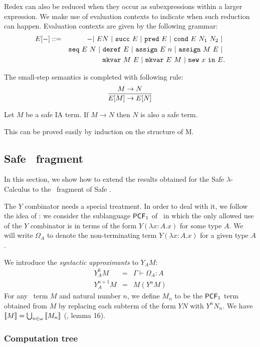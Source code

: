 Redex can also be reduced when they occur as subexpressions within a
larger expression. We make use of evaluation contexts to indicate
when such reduction can happen. Evaluation contexts are given by the
following grammar:
\begin{eqnarray*}
E[-] &::=& - |\ E N\ |\ \pcfsucc\ E\ |\ \pcfpred\ E\ |\ \pcfcond\ E\ N_1\ N_2\ |\ \\
&&    \iaseq\ E\ N\ |\ \iaderef\ E\ |\ \iaassign\ E\ n\ |\ \iaassign\ M\ E \ |\ \\
&&    \iamkvar\ M\ E\ |\ \iamkvar\ E\ M\ |\ \ianewin{x}\ E  .
\end{eqnarray*}

The small-step semantics is completed with following rule:
$$ \frac{\displaystyle M \rightarrow N}{E[M] \rightarrow E[N]} $$

\begin{lem}
\label{lem:ia_safety_preserved} Let $M$ be a safe IA term. If
$M \rightarrow N$ then $N$ is also a safe term.
\end{lem}
This can be proved easily by induction on the structure of M.


\subsection{Safe \pcf\ fragment}
In this section, we show how to extend the results obtained for the
Safe $\lambda$-Calculus to the \pcf\ fragment of Safe \ialgol.

The $Y$ combinator needs a special treatment. In order to deal with
it, we follow the idea of \cite{abramsky:game-semantics-tutorial}:
we consider the sublanguage $\textsf{PCF}_1$ of \pcf\ in which the only
allowed use of the $Y$ combinator is in terms of the form $Y(
\lambda x:A .x )$ for some type $A$. We will write $\Omega_A$ to
denote the non-terminating term $Y(\lambda x:A .x)$ for a given type
$A$.

We introduce the \emph{syntactic approximants} to $Y_A M$:
\begin{eqnarray*}
Y^0_A M &=& \Gamma \vdash \Omega_A : A\\
Y^{n+1}_A M &=& M( Y^n M )
\end{eqnarray*}
For any \pcf\ term $M$ and natural number $n$, we define $M_n$ to be
the $\textsf{PCF}_1$ term obtained from $M$ by replacing each subterm of the
form $Y N$ with $Y^n N_n$. We have ${[\![ M ]\!]} = \bigcup_{n\in\omega}
{[\![ M_n ]\!]}$ (\cite{abramsky:game-semantics-tutorial}, lemma 16).


\subsubsection{Computation tree}

